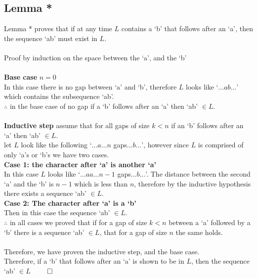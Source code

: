 \documentclass{article}
\begin{document}
    \subsection{Lemma *}
      Lemma * proves that if at any time $L$ contains a `b' that follows after an `a', then the sequence `ab' must exist in $L$. \\
      \\
      Proof by induction on the space between the `a', and the `b'\\
      \\
      \textbf{Base case} $n = 0$\\
      In this case there is no gap between `a' and `b', therefore $L$ looks like `$\ldots ab \ldots$'\\
      which contains the subsequence `ab'.\\
      $\therefore$ in the base case of no gap if a `b' follows after an `a' then `ab' $\in L$.\\
      \\
      \textbf{Inductive step} assume that for all gaps of size $k < n$ if an `b' follows after an `a' then `ab' $\in L$.\\
      let $L$ look like the following `$\ldots a \ldots n$ gaps$ \ldots b \ldots$', however since $L$ is comprised of only `a's or `b's we have two cases.\\
      \textbf{Case 1: the character after `a' is another `a'}\\
      In this case $L$ looks like `$\ldots aa \ldots n-1$ gaps$ \ldots b \ldots$'. The distance between the second `a' and the `b' is $n-1$ which is less than $n$, therefore by the inductive hypothesis there exists a sequence `ab' $\in L$.\\
      \textbf{Case 2: The character after `a' is a `b'}\\
      Then in this case the sequence `ab' $\in L$.\\
      $\therefore$ in all cases we proved that if for a gap of size $k < n$ between a `a' followed by a `b' there is a sequence `ab' $\in L$, that for a gap of size $n$ the same holds.\\
      \\
      Therefore, we have proven the inductive step, and the base case. \\
      Therefore, if a `b' that follows after an `a' is shown to be in $L$, then the sequence `ab' $\in L$ $\qed$
\end{document}
